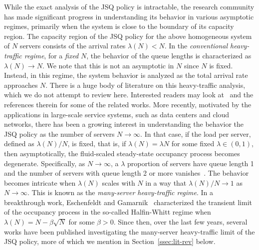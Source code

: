 \documentclass[11pt, reqno]{article}
\numberwithin{equation}{section}
\numberwithin{theorem}{section}
\newcommand\blue[1]{#1}
\begin{document}
While the exact analysis of the JSQ policy is intractable, the research community has made significant progress in understanding its behavior in various asymptotic regimes, primarily when the system is close to the boundary of its capacity region. %
The capacity region of the JSQ policy for the above homogeneous system of $N$ servers consists of the arrival rates $\lambda(N) < N$.
\blue{In the \emph{conventional heavy-traffic regime}, for a \emph{fixed} $N$, the behavior of the queue lengths is characterized as $\lambda(N)\to N$.
We note that this is not an asymptotic in $N$ since $N$ is fixed. Instead, in this regime, the system behavior is analyzed as the total arrival rate approaches $N$.}
There is a huge body of literature on this heavy-traffic analysis, which we do not attempt to review here.
Interested readers may look at~\cite{Foschini77,FS78,Reiman84,ZHW95} and the references therein for some of the related works.
More recently, motivated by the applications in large-scale service systems, such as data centers and cloud networks, there has been a growing interest in understanding the behavior the JSQ policy as the number of servers $N\to\infty$.
In that case, if the load per server, \blue{defined as $\lambda(N)/N$,} is fixed, \blue{that is, if $\lambda(N) = \lambda N$ for some fixed $\lambda\in (0,1)$}, then asymptotically, the fluid-scaled steady-state occupancy process becomes degenerate.
Specifically, as $N\to\infty$, a $\lambda$ proportion of servers have queue length 1 and the number of servers with queue length 2 or more vanishes~\cite{MBLW16-3}.
The behavior becomes intricate when $\lambda(N)$ scales with $N$ in a way that $\lambda(N)/N\to 1$ as $N\to\infty$. 
This is known as the \emph{many-server heavy-traffic regime}.
In a breakthrough work, Eschenfeldt and Gamarnik~\cite{EG15} characterized the transient limit of the occupancy process in the so-called Halfin-Whitt regime when $\lambda(N) = N - \beta \sqrt{N}$ for some $\beta>0$.
Since then, over the last few years, several works have been published investigating the many-server heavy-traffic limit of the JSQ policy, more of which we mention in Section~\ref{ssec:lit-rev} below.
\end{document}
